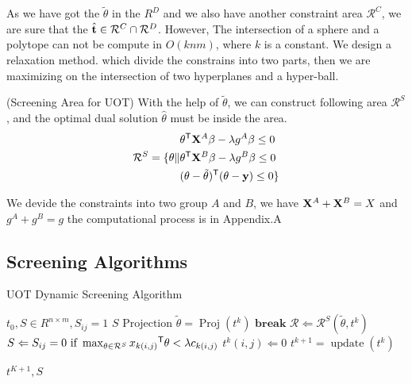 As we have got the $\tilde{\theta}$ in the $R^{D}$ and we also have another constraint area $\mathcal{R}^{C}$, we are sure that the $\hat{\mathbf t} \in \mathcal{R}^{C}\cap\mathcal{R}^{D}$. However, The intersection of a sphere and a polytope can not be compute in $O(knm)$, where $k$ is a constant.  We design a relaxation method. which divide the constrains into two parts, then we are maximizing on the intersection of two hyperplanes and a hyper-ball. 

\begin{thm}\label{area}(Screening Area for UOT) With the help of $\tilde{\theta}$, we can construct following area $\mathcal{R}^{S}$, and the optimal dual solution $\hat{\theta}$ must be inside the area.
 \begin{equation}
\begin{split} 
\mathcal{R}^S = \{ \theta \|
\begin{aligned}
 &\theta^{\mathsf T}\mathbf{X}^A\beta - \lambda g^{A}\beta\leq 0 \\
  &\theta^{\mathsf T}\mathbf{X}^B\beta - \lambda g^{B}\beta \leq 0\\
   &(\theta-\tilde{\theta})^{\mathsf T}(\theta-\mathbf y)\leq 0\}
\end{aligned}
\end{split}
\label{eq:divide}
\end{equation}
\end{thm}
We devide the constraints into two group $A$ and $B$, we have $\mathbf{X}^A +\mathbf{X}^B=X$ and $g^A+g^B = g$
the computational process is in Appendix.A

\subsection{Screening Algorithms}

 \begin{algorithm}
 \caption{UOT Dynamic Screening Algorithm}
 \begin{algorithmic}[1]
 \renewcommand{\algorithmicrequire}{\textbf{Input:}}
 \renewcommand{\algorithmicensure}{\textbf{Output:}}
 \REQUIRE $t_0, S \in R^{n\times m}, S_{ij}=1$
 \ENSURE  $S$
  \STATE {}
  \STATE $\text{Projection } \tilde{\theta} = \operatorname{Proj}(t^k)$ 
  \STATE $\textbf{break}$
  \ENDIF
    \STATE $\mathcal{R} \Leftarrow \mathcal{R}^S{(\tilde{\theta},t^k)}$
    \STATE $S \Leftarrow {S_{ij} = 0 \text{ if } \max_{\theta \in \mathcal{R}^S} {x_{k(i,j)}}^{\mathsf T}\theta <\lambda c_{k(i,j)} }$
    \STATE $t^k(i,j) \Leftarrow 0$
    \ENDFOR
    \STATE $t^{k+1} = \operatorname{update}(t^k)$
  \ENDFOR
  
 \RETURN $t^{K+1}, S $ 
 \end{algorithmic} 
 \end{algorithm}

